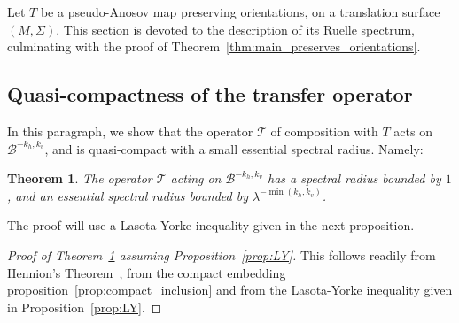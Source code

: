 \documentclass[11pt, a4paper, oneside, final, pagebackref]{amsart}
\newcommand{\boB}{\mathcal{B}}
\newcommand{\boT}{\mathcal{T}}
\newtheorem{thm}{Theorem}[section]
\theoremstyle{definition}
\numberwithin{equation}{section}
\begin{document}
\label{sec:Ruelle_spectrum}

Let $T$ be a pseudo-Anosov map preserving orientations, on a translation
surface $(M,\Sigma)$. This section is devoted to the description of its
Ruelle spectrum, culminating with the proof of
Theorem~\ref{thm:main_preserves_orientations}.

\subsection{Quasi-compactness of the transfer operator}

In this paragraph, we show that the operator $\boT$ of composition with $T$
acts on $\boB^{-k_h, k_v}$, and is quasi-compact with a small essential
spectral radius. Namely:

\begin{thm}
\label{thm:rho_ess} The operator $\boT$ acting on $\boB^{-k_h, k_v}$ has a
spectral radius bounded by $1$, and an essential spectral radius bounded by
$\lambda^{- \min(k_h, k_v)}$.
\end{thm}

The proof will use a Lasota-Yorke inequality given in the next proposition.

\begin{proof}[Proof of Theorem~\ref{thm:rho_ess} assuming Proposition~\ref{prop:LY}]
This follows readily from Hennion's Theorem~\cite{hennion}, from the compact
embedding proposition~\ref{prop:compact_inclusion} and from the Lasota-Yorke
inequality given in Proposition~\ref{prop:LY}.
\end{proof}
\end{document}
